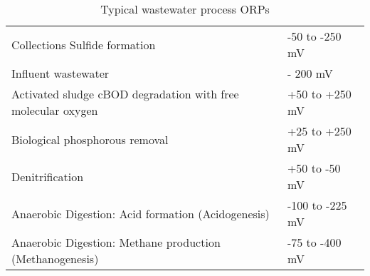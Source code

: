 			
			\setlength{\arrayrulewidth}{0.3mm}
			\setlength{\tabcolsep}{8 pt}
			\renewcommand{\arraystretch}{0.8}
\begin{table}[h!]			
			\begin{center}
				\begin{tabular}{ |p{9.5cm}|p{4.0cm}|}
					\hline
					
					\hline
					\small Collections	Sulfide formation                                & \small -50 to -250 mV  \\
					\small Influent wastewater                                          & \small - 200 mV        \\
					\small Activated sludge	cBOD degradation with free molecular oxygen & \small +50 to +250 mV  \\
					\small Biological phosphorous removal                               & \small +25 to +250 mV  \\
					\small Denitrification                                              & \small +50 to -50 mV   \\
					\small Anaerobic Digestion: Acid formation (Acidogenesis)           & \small -100 to -225 mV \\
					\small Anaerobic Digestion: Methane production (Methanogenesis)     & \small -75 to -400 mV  \\
					\hline
				\end{tabular}
				
			\end{center}
			\caption{Typical wastewater process ORPs}
\end{table}			
